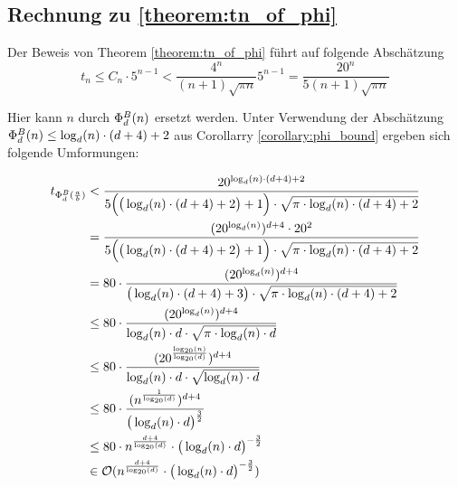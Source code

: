 \documentclass{article}
\theoremstyle{nonumberplain}
\begin{document}
\subsection{Rechnung zu \ref{theorem:tn_of_phi}}

Der Beweis von Theorem \ref{theorem:tn_of_phi} führt auf folgende Abschätzung
    \[t_n \leq C_n \cdot 5^{n-1} < \frac{4^n}{(n+1)\sqrt{\pi n}} 5^{n-1} =  \frac{20^n}{5(n+1)\sqrt{\pi n}}\]

Hier kann \(n\) durch \(\Phi_{d}^{B}(n)\) ersetzt werden.
Unter Verwendung der Abschätzung \(\Phi_{d}^{B}(n) \leq \log_d(n) \cdot (d+4) + 2\) aus Corollarry \ref{corollary:phi_bound} ergeben sich folgende Umformungen:


\begin{align*}
    t_{\Phi_{d}^{B}(\frac{a}{b})}
    &< \frac{20^{\log_d(n)\cdot(d+4)+2}}{5\Big(\big(\log_d(n) \cdot (d+4)+2\big)+1\Big) \cdot \sqrt{\pi \cdot \log_d(n) \cdot (d+4) + 2}} \\
    &= \frac{(20^{\log_d(n)})^{d+4}\cdot20^2}{5\Big(\big(\log_d(n) \cdot (d+4)+2\big)+1\Big) \cdot \sqrt{\pi \cdot \log_d(n) \cdot (d + 4) + 2}} \\
    &= 80\cdot\frac{(20^{\log_d(n)})^{d+4}}{\big(\log_d(n) \cdot (d+4)+3\big) \cdot\sqrt{\pi \cdot \log_d(n)\cdot(d+4)+2}} \\
    &\leq 80\cdot\frac{(20^{\log_d(n)})^{d+4}}{\log_d(n) \cdot d \cdot \sqrt{\pi \cdot \log_d(n) \cdot d}} \\
    &\leq 80\cdot\frac{(20^{\frac{\log_{20}(n)}{\log_{20}(d)}})^{d+4}}{\log_d(n) \cdot d \cdot \sqrt{\log_d(n) \cdot d}} \\
    &\leq 80\cdot\frac{(n^{\frac{1}{\log_{20}(d)}})^{d+4}}{\big(\log_d(n) \cdot d\big)^{\frac{3}{2}}} \\
    &\leq 80 \cdot n^{\frac{d+4}{\log_{20}(d)}} \cdot \big(\log_d(n) \cdot d\big)^{-\frac{3}{2}} \\
    &\in \mathcal{O}(n^{\frac{d+4}{\log_{20}(d)}} \cdot \big(\log_d(n) \cdot d\big)^{-\frac{3}{2}}) \\
\end{align*}
\end{document}
